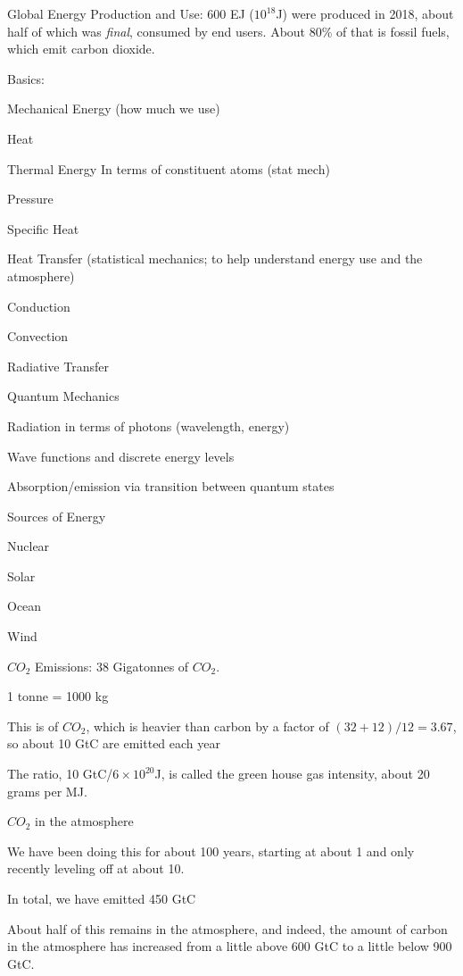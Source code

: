\documentclass[11pt]{book}
\begin{document}
\bei
\item Global Energy Production and Use: 600 EJ ($10^{18}$J) were produced in 2018, about half of which was {\it final}, consumed by end users. About 80\% of that is fossil fuels, which emit carbon dioxide. 
\item Basics:
\bee
\item Mechanical Energy (how much we use)
\item Heat
\bei
\item Thermal Energy In terms of constituent atoms (stat mech)
\item Pressure
\item Specific Heat
\eei
\item Heat Transfer (statistical mechanics; to help understand energy use and the atmosphere)
\bei
\item Conduction
\item Convection
\item Radiative Transfer
\eei
\item Quantum Mechanics 
\bei
\item Radiation in terms of photons (wavelength, energy)
\item Wave functions and discrete energy levels 
\item Absorption/emission via transition between quantum states
\eei 
\eee
\item Sources of Energy
\bee
\item Nuclear
\item Solar
\item Ocean
\item Wind
\eee 
\item $CO_2$ Emissions: 38 Gigatonnes of $CO_2$. 
\bee
\item 1 tonne = 1000 kg
\item This is of $CO_2$, which is heavier than carbon by a factor of $(32+12)/12=3.67$, so about 10 GtC are emitted each year
\item The ratio, 10 GtC/$6\times 10^{20}$J, is called the green house gas intensity, about 20 grams per MJ.
\eee
\item $CO_2$ in the atmosphere
\bee
\item We have been doing this for about 100 years, starting at about 1 and only recently leveling off at about 10. 
\item In total, we have emitted 450 GtC
\item About half of this remains in the atmosphere, and indeed, the amount of carbon in the atmosphere has increased from a little above 600 GtC to a little below 900 GtC.
\end{document}

